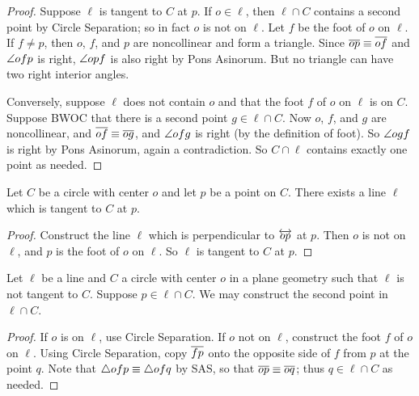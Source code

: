 \begin{proof}
Suppose \(\ell\) is tangent to \(C\) at \(p\). If \(o \in \ell\), then \(\ell \cap C\) contains a second point by Circle Separation; so in fact \(o\) is not on \(\ell\). Let \(f\) be the foot of \(o\) on \(\ell\). If \(f \neq p\), then \(o\), \(f\), and \(p\) are noncollinear and form a triangle. Since \(\overline{op} \equiv \overline{of}\) and \(\angle{ofp}\) is right, \(\angle{opf}\) is also right by Pons Asinorum. But no triangle can have two right interior angles.

Conversely, suppose \(\ell\) does not contain \(o\) and that the foot \(f\) of \(o\) on \(\ell\) is on \(C\). Suppose BWOC that there is a second point \(g \in \ell \cap C\). Now \(o\), \(f\), and \(g\) are noncollinear, and \(\overline{of} \equiv \overline{og}\), and \(\angle{ofg}\) is right (by the definition of foot). So \(\angle{ogf}\) is right by Pons Asinorum, again a contradiction. So \(C \cap \ell\) contains exactly one point as needed. 
\end{proof}

\begin{construct}
Let \(C\) be a circle with center \(o\) and let \(p\) be a point on \(C\). There exists a line \(\ell\) which is tangent to \(C\) at \(p\).
\end{construct}

\begin{proof}
Construct the line \(\ell\) which is perpendicular to \(\overleftrightarrow{op}\) at \(p\). Then \(o\) is not on \(\ell\), and \(p\) is the foot of \(o\) on \(\ell\). So \(\ell\) is tangent to \(C\) at \(p\).
\end{proof}

\begin{construct}
Let \(\ell\) be a line and \(C\) a circle with center \(o\) in a plane geometry such that \(\ell\) is not tangent to \(C\). Suppose \(p \in \ell \cap C\). We may construct the second point in \(\ell \cap C\).
\end{construct}

\begin{proof}
If \(o\) is on \(\ell\), use Circle Separation. If \(o\) not on \(\ell\), construct the foot \(f\) of \(o\) on \(\ell\). Using Circle Separation, copy \(\overline{fp}\) onto the opposite side of \(f\) from \(p\) at the point \(q\). Note that \(\bigtriangleup{ofp} \equiv \bigtriangleup{ofq}\) by SAS, so that \(\overline{op} \equiv \overline{oq}\); thus \(q \in \ell \cap C\) as needed.
\end{proof}

